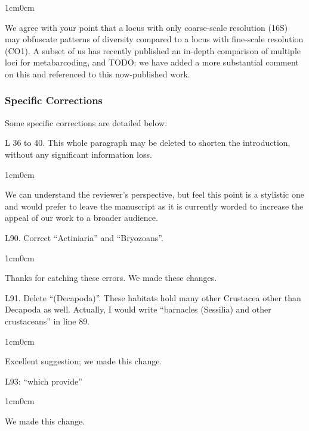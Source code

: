 \documentclass{article}
\newenvironment{response}
	{
	\begin{adjustwidth}{1cm}{0cm}
	\itshape %
	}
	{
	\end{adjustwidth}
	}
\begin{document}
\begin{response}
	We agree with your point that a locus with only coarse-scale resolution (16S) may obfuscate patterns of diversity compared to a locus with fine-scale resolution (CO1). A subset of us has recently published an in-depth comparison of multiple loci for metabarcoding, and TODO: we have added a more substantial comment on this and referenced to this now-published work.
\\
\end{response}

\subsubsection*{Specific Corrections}
Some specific corrections are detailed below:

L 36 to 40. This whole paragraph may be deleted to shorten the introduction, without any significant information loss.
\begin{response}
  We can understand the reviewer's perspective, but feel this point is a stylistic one and would prefer to leave the manuscript as it is currently worded to increase the appeal of our work to a broader audience.\\
\end{response}

L90. Correct ``Actiniaria'' and ``Bryozoans''.
\begin{response}
  Thanks for catching these errors. We made these changes.\\
\end{response}

L91. Delete ``(Decapoda)''. These habitats hold many other Crustacea other than Decapoda as well. Actually, I would write ``barnacles (Sessilia) and other crustaceans'' in line 89.
\begin{response}
  Excellent suggestion; we made this change.\\
\end{response}

L93: ``which provide''
\begin{response}
  We made this change.\\
\end{response}
\end{document}
